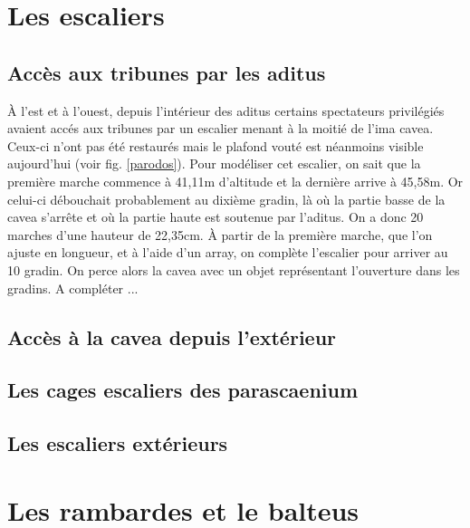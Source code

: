 \section{Les escaliers} \label{sect-escaliers}

\subsection{Accès aux tribunes par les aditus}
\`A l'est et à l'ouest, depuis l'intérieur des aditus certains spectateurs privilégiés avaient accés aux tribunes par un escalier menant à la moitié de l'ima cavea. Ceux-ci n'ont pas été restaurés mais le plafond vouté est néanmoins visible aujourd'hui (voir fig. \ref{parodos}). Pour modéliser cet escalier, on sait que la première marche commence à 41,11m d'altitude et la dernière arrive à 45,58m. Or celui-ci débouchait probablement au dixième gradin, là où la partie basse de la cavea s'arrête et où la partie haute est soutenue par l'aditus. On a donc 20 marches d'une hauteur de 22,35cm. \`{A} partir de la première marche, que l'on ajuste en longueur, et à l'aide d'un \gls{array}, on complète l'escalier pour arriver au 10 gradin. On perce alors la cavea avec un objet représentant l'ouverture dans les gradins. A compléter ...

\subsection{Accès à la cavea depuis l'extérieur}

\subsection{Les cages escaliers des \gls{parascaenium}}

\subsection{Les escaliers extérieurs}

\section{Les rambardes et le \gls{balteus}} 

